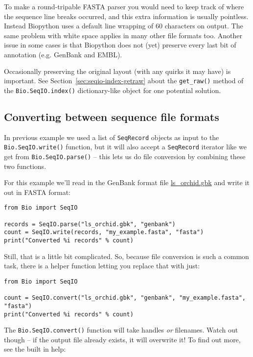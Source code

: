 To make a round-tripable FASTA parser you would need to keep track of where the
sequence line breaks occurred, and this extra information is usually pointless.
Instead Biopython uses a default line wrapping of $60$ characters on output.
The same problem with white space applies in many other file formats too.
Another issue in some cases is that Biopython does not (yet) preserve every
last bit of annotation (e.g. GenBank and EMBL).

Occasionally preserving the original layout (with any quirks it may have) is
important. See Section~\ref{sec:seqio-index-getraw} about the \verb|get_raw()|
method of the \verb|Bio.SeqIO.index()| dictionary-like object for one potential
solution.

\subsection{Converting between sequence file formats}
\label{sec:SeqIO-conversion}

In previous example we used a list of \verb|SeqRecord| objects as input to the \verb|Bio.SeqIO.write()| function, but it will also accept a \verb|SeqRecord| iterator like we get from \verb|Bio.SeqIO.parse()| -- this lets us do file conversion by combining these two functions.

For this example we'll read in the GenBank format file \href{https://raw.githubusercontent.com/biopython/biopython/master/Doc/examples/ls_orchid.gbk}{ls\_orchid.gbk} and write it out in FASTA format:

\begin{verbatim}
from Bio import SeqIO

records = SeqIO.parse("ls_orchid.gbk", "genbank")
count = SeqIO.write(records, "my_example.fasta", "fasta")
print("Converted %i records" % count)
\end{verbatim}

Still, that is a little bit complicated. So, because file conversion is such a
common task, there is a helper function letting you replace that with just:

\begin{verbatim}
from Bio import SeqIO

count = SeqIO.convert("ls_orchid.gbk", "genbank", "my_example.fasta", "fasta")
print("Converted %i records" % count)
\end{verbatim}

The \verb|Bio.SeqIO.convert()| function will take handles \emph{or} filenames.
Watch out though -- if the output file already exists, it will overwrite it!
To find out more, see the built in help:

